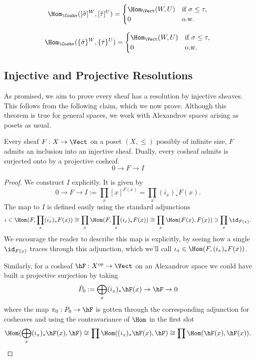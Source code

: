 \begin{equation*}
 \Hom_{\Coshv}([\hat{\sigma}]^W,[\hat{\tau}]^U)=
\begin{cases}
 \Hom_{\Vect}(W,U) & \text{if } \sigma \leq \tau, \\
0 & \text{o.w.}
\end{cases}
\end{equation*}

\begin{equation*}
 \Hom_{\Coshv}(\{\hat{\sigma}\}^W,\{\hat{\tau}\}^U)=
\begin{cases}
 \Hom_{\Vect}(W,U) & \text{if } \sigma \leq \tau, \\
0 & \text{o.w.}
\end{cases}
\end{equation*}

\subsection{Injective and Projective Resolutions}
\label{subsubsec:resolutions}

As promised, we aim to prove every sheaf has a resolution by injective sheaves. This follows from the following claim, which we now prove. Although this theorem is true for general spaces, we work with Alexandrov spaces arising as posets as usual.

\begin{clm}
	Every sheaf $F:X\to\Vect$ on a poset $(X,\leq)$ possibly of infinite size, $F$ admits an inclusion into an injective sheaf. Dually, every cosheaf admits is surjected onto by a projective cosheaf.
	\[
		0 \to F \to I
	\]
\end{clm}
\begin{proof}
	We construct $I$ explicitly. It is given by
	\[
		0 \to F \to I:=\prod_x [x]^{F(x)} = \prod_x (i_x)_*F(x).
	\]
	The map to $I$ is defined easily using the standard adjunctions
	\[
		\iota\in \Hom(F,\prod_x(i_x)_*F(x))\cong \prod_x \Hom(F,\prod_x(i_x)_*F(x)) \cong \prod_x \Hom(F(x),F(x)) \ni \prod_x \id_{F(x)}.
	\]
	We encourage the reader to describe this map is explicitly, by seeing how a single $\id_{F(x)}$ traces through this adjunction, which we'll call $\iota_x\in \Hom(F,(i_x)_*F(x))$.
	
	Similarly, for a cosheaf $\hF:X^{op}\to\Vect$ on an Alexandrov space we could have built a projective surjection by taking
	\[
	 \hat{P}_0:=\bigoplus_{x} (i_x)_*\hF(x) \to \hF \to 0
	\]
	where the map $\pi_0:P_0\to \hF$ is gotten through the corresponding adjunction for cosheaves and using the contravariance of $\Hom$ in the first slot
	\[
		\Hom(\bigoplus_{x} (i_x)_*\hF(x),\hF)\cong \prod \Hom((i_x)_*\hF(x),\hF)\cong \prod \Hom(\hF(x),\hF(x)).
	\]
\end{proof}

